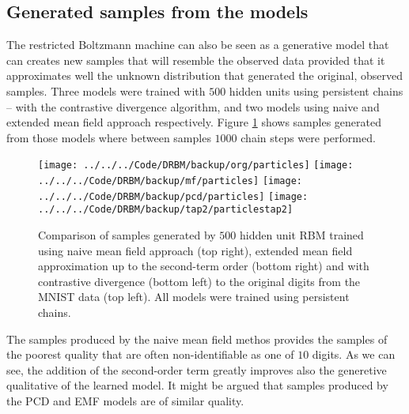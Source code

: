 \subsection{Generated samples from the models}
The restricted Boltzmann machine can also be seen as a generative model that can creates new samples that will resemble the observed data provided that it approximates well the unknown distribution that generated the original, observed samples. Three models were trained with $500$ hidden units using persistent chains -- with the contrastive divergence algorithm, and two models using naive and extended mean field approach respectively. Figure \ref{fig:particles} shows samples generated from those models where between samples $1000$ chain steps were performed.
\begin{figure}[!htb]
%
 \texttt{[image: ../../../Code/DRBM/backup/org/particles]}
\endminipage 
\hfill
{}  
 \texttt{[image: ../../../Code/DRBM/backup/mf/particles]}
\endminipage
\vspace{2em}
 \texttt{[image: ../../../Code/DRBM/backup/pcd/particles]}
\endminipage 
\hfill
{}  
 \texttt{[image: ../../../Code/DRBM/backup/tap2/particlestap2]}
\endminipage
  \caption[Generated samples from trained models]{Comparison of samples generated by $500$ hidden unit RBM trained using naive mean field approach (top right), extended mean field approximation up to the second-term order (bottom right) and with contrastive divergence (bottom left) to the original digits from the MNIST data (top left). All models were trained using persistent chains.}
  \label{fig:particles}
\end{figure}
The samples produced by the naive mean field methos provides the samples of the poorest quality that are often non-identifiable as one of $10$ digits. As we can see, the addition of the second-order term greatly improves also the generetive qualitative of the learned model. It might be argued that samples produced by the PCD and EMF models are of similar quality.
